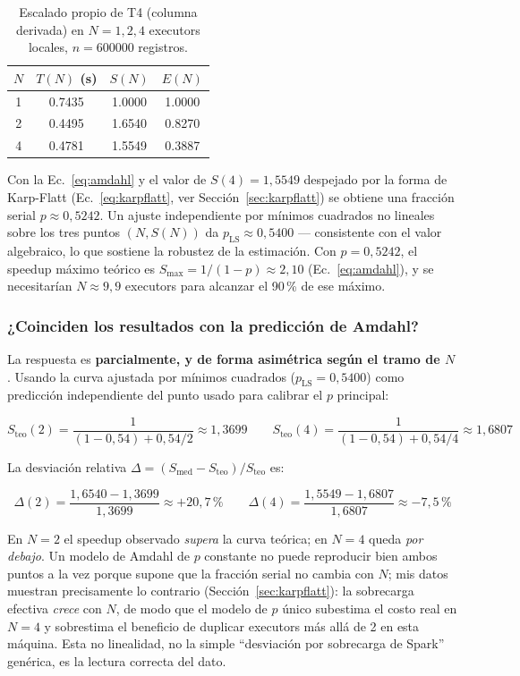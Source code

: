 \documentclass[11pt,a4paper]{article}
\begin{document}
\begin{table}[htbp]
\centering
\caption{Escalado propio de T4 (columna derivada) en \(N=1,2,4\) executors locales, \(n=\num{600000}\) registros.}
\label{tab:escalado-t4}
\begin{tabular}{cS[table-format=1.4]S[table-format=1.4]S[table-format=1.4]}
\toprule
{\(N\)} & {\(T(N)\) (s)} & {\(S(N)\)} & {\(E(N)\)} \\
 & 0.7435 & 1.0000 & 1.0000 \\
2 & 0.4495 & 1.6540 & 0.8270 \\
4 & 0.4781 & 1.5549 & 0.3887 \\
\bottomrule
\end{tabular}
\end{table}

Con la Ec.~\eqref{eq:amdahl} y el valor de \(S(4)=1{,}5549\) despejado por la forma de
Karp-Flatt (Ec.~\eqref{eq:karpflatt}, ver Sección~\ref{sec:karpflatt}) se obtiene una fracción
serial \(p \approx 0{,}5242\). Un ajuste independiente por mínimos cuadrados no lineales sobre
los tres puntos \((N, S(N))\) da \(p_{\text{LS}} \approx 0{,}5400\) --- consistente con el valor
algebraico, lo que sostiene la robustez de la estimación. Con \(p=0{,}5242\), el speedup máximo
teórico es \(S_{\max} = 1/(1-p) \approx 2{,}10\) (Ec.~\ref{eq:amdahl}), y se necesitarían
\(N\approx 9{,}9\) executors para alcanzar el 90\,\% de ese máximo.

\subsubsection{¿Coinciden los resultados con la predicción de Amdahl?}
\label{sec:pregunta-p1}

La respuesta es \textbf{parcialmente, y de forma asimétrica según el tramo de \(N\)}. Usando la
curva ajustada por mínimos cuadrados (\(p_{\text{LS}}=0{,}5400\)) como predicción independiente
del punto usado para calibrar el \(p\) principal:

\[
S_{\text{teo}}(2) = \frac{1}{(1-0{,}54)+0{,}54/2} \approx 1{,}3699 \qquad
S_{\text{teo}}(4) = \frac{1}{(1-0{,}54)+0{,}54/4} \approx 1{,}6807
\]

La desviación relativa \(\Delta = (S_{\text{med}}-S_{\text{teo}})/S_{\text{teo}}\) es:

\[
\Delta(2) = \frac{1{,}6540-1{,}3699}{1{,}3699} \approx +20{,}7\,\% \qquad
\Delta(4) = \frac{1{,}5549-1{,}6807}{1{,}6807} \approx -7{,}5\,\%
\]

En \(N=2\) el speedup observado \emph{supera} la curva teórica; en \(N=4\) queda \emph{por
debajo}. Un modelo de Amdahl de \(p\) constante no puede reproducir bien ambos puntos a la vez
porque supone que la fracción serial no cambia con \(N\); mis datos muestran precisamente lo
contrario (Sección~\ref{sec:karpflatt}): la sobrecarga efectiva \emph{crece} con \(N\), de modo
que el modelo de \(p\) único subestima el costo real en \(N=4\) y sobrestima el beneficio de
duplicar executors más allá de 2 en esta máquina. Esta no linealidad, no la simple ``desviación
por sobrecarga de Spark'' genérica, es la lectura correcta del dato.
\end{document}
